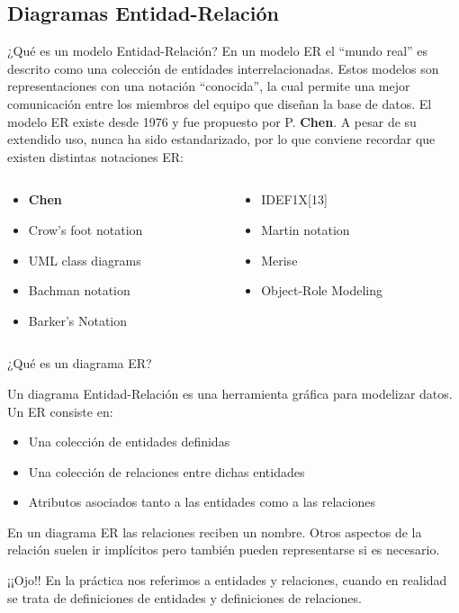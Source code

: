 \documentclass{classes/beamer_GeomaticaUA}
\begin{document}
\subsection{Diagramas Entidad-Relación}
\begin{frame}{¿Qué es un modelo Entidad-Relación?}
En un modelo ER el ``mundo real'' es descrito como una colección de entidades interrelacionadas. Estos modelos son representaciones con una notación ``conocida'', la cual permite una mejor comunicación entre los miembros del equipo que diseñan la base de datos. El modelo ER existe desde 1976 y fue propuesto por P. \textbf{Chen}. A pesar de su extendido uso, nunca ha sido estandarizado, por lo que conviene recordar que existen distintas notaciones ER:

\begin{columns}
\begin{column}{0.5\textwidth}
\begin{itemize}
\item \textbf{Chen}
\item Crow's foot notation
\item UML class diagrams
\item Bachman notation
\item Barker's Notation
\end{itemize}
\end{column}

\begin{column}{0.5\textwidth}
\begin{itemize}
\item IDEF1X[13]
\item Martin notation
\item Merise
\item Object-Role Modeling
\end{itemize}
\end{column}
\end{columns}

\end{frame}

\begin{frame}{¿Qué es un diagrama ER?}

Un diagrama Entidad-Relación es una herramienta gráfica para modelizar datos. Un ER consiste en:
\begin{itemize}
\item Una colección de entidades definidas
\item Una colección de relaciones entre dichas entidades
\item Atributos asociados tanto a las entidades como a las relaciones 
\end{itemize}

En un diagrama ER las relaciones reciben un nombre. Otros aspectos de la relación suelen ir implícitos pero también pueden representarse si es necesario.

\bigskip
¡¡Ojo!! En la práctica nos referimos a entidades y relaciones, cuando en realidad se trata de definiciones de entidades y definiciones de relaciones. 
\end{frame}
\end{document}
